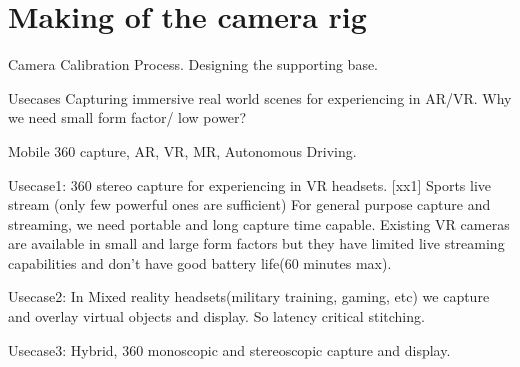 \chapter{Making of the camera rig}

Camera Calibration Process.
Designing the supporting base.




Usecases \newline
Capturing immersive real world scenes for experiencing in AR/VR. 
Why we need small form factor/ low power?

Mobile 360 capture, AR, VR, MR, Autonomous Driving. \newline

Usecase1: 360 stereo capture for experiencing in VR headsets. 
[xx1] Sports live stream (only few powerful ones are sufficient)
For general purpose capture and streaming, we need portable and long capture time capable. Existing VR cameras are available in small and large form factors but they have limited live streaming capabilities and don't have good battery life(60 minutes max). 

Usecase2: In Mixed reality headsets(military training, gaming, etc) we capture and overlay virtual objects and display. So latency critical stitching. 

Usecase3: Hybrid, 360 monoscopic and stereoscopic capture and display.
